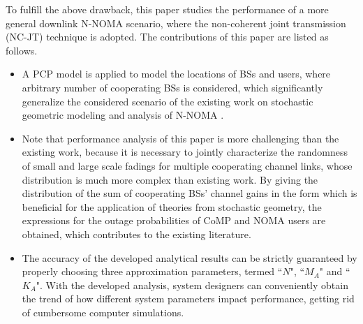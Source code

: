 \documentclass[10pt, doublecolumn]{IEEEtran}
\begin{document}
{\color{black}To fulfill the above drawback, this paper studies the performance of a more general downlink N-NOMA scenario, {\color{black}where the non-coherent joint transmission (NC-JT) technique \cite{tanbourgi2014tractable} is adopted}. The contributions of this paper are listed as follows.
\begin{itemize}
  \item A PCP model is applied to model the locations of BSs and users, where arbitrary number of cooperating BSs is considered, which significantly generalize the considered scenario of the existing work on stochastic geometric modeling and analysis of N-NOMA \cite{zhang2020performance, sun2021outage,elhattab2020comp}.
  \item Note that performance analysis of this paper is more challenging than the existing work, because it is necessary to jointly characterize the randomness of small and large scale fadings for multiple
      cooperating channel links, whose distribution is much more complex than existing work.  By giving the distribution of the sum of cooperating BSs' channel gains in the form which is beneficial for the application of theories from stochastic geometry, the expressions for the outage probabilities of CoMP and NOMA users are obtained, which contributes to the existing literature.
  \item The accuracy of the developed analytical results can be strictly guaranteed by properly choosing three approximation parameters, termed ``$N$", ``$M_A$" and ``$K_A$". With the developed analysis, system designers can conveniently obtain the trend of how different system parameters impact performance, getting rid of cumbersome computer simulations.
\end{itemize}}
\end{document}
